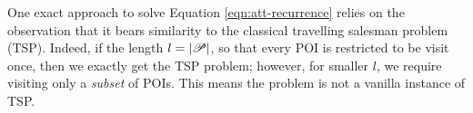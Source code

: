 



One exact approach to solve Equation \ref{eqn:att-recurrence}
relies on the observation that
it bears similarity to the classical travelling salesman problem (TSP).
Indeed, if the length $l = |\mathscr{P}|$, so that every POI is restricted to be visit once,
then we exactly get the TSP problem;
however, for smaller $l$, we require visiting only a \emph{subset} of POIs.
This means the problem is not a vanilla instance of TSP.


